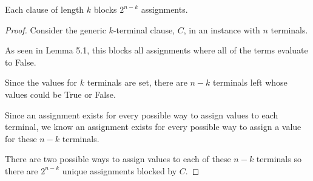 \documentclass[manuscript]{acmart}
\begin{document}
    \begin{lemma}
        Each clause of length $k$ blocks $2^{n-k}$ assignments.
    \end{lemma}
    \begin{proof}
        Consider the generic $k$-terminal clause, $C$, in an instance with
        $n$ terminals.

        As seen in Lemma 5.1, this blocks all assignments where all of the terms
        evaluate to False.

        Since the values for $k$ terminals are set, there are $n-k$ terminals left
        whose values could be True or False.

        Since an assignment exists for every possible way to assign values to
        each terminal, we know an assignment exists for every possible way to
        assign a value for these $n-k$ terminals.

        There are two possible ways to assign values to each of these $n-k$ terminals
        so there are $2^{n-k}$ unique assignments blocked by $C$.
    \end{proof}
\end{document}
